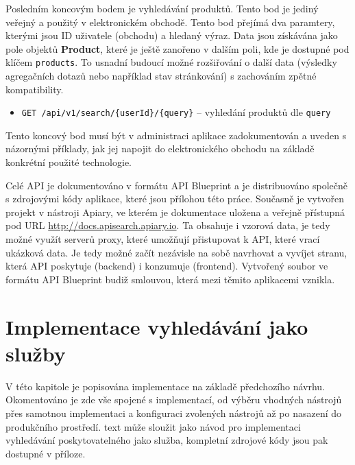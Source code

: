 \documentclass[FM,DP]{tulthesis}
\begin{document}
Posledním koncovým bodem je vyhledávání produktů. Tento bod je jediný veřejný a použitý
v elektronickém obchodě. Tento bod přejímá dva paramtery, kterými jsou ID uživatele
(obchodu) a hledaný výraz. Data jsou získávána jako pole objektů \textbf{Product}, 
které je ještě zanořeno v dalším poli, kde je dostupné pod klíčem \verb|products|.
To usnadní budoucí možné rozšiřování o další data (výsledky agregačních dotazů nebo 
například stav stránkování) s zachováním zpětné kompatibility.

\begin{itemize}
\item \verb|GET /api/v1/search/{userId}/{query}| -- vyhledání produktů dle \verb|query|
\end{itemize}

Tento koncový bod musí být v administraci aplikace zadokumentován a uveden s názornými 
příklady, jak jej napojit do elektronického obchodu na základě konkrétní použité technologie.

Celé API je dokumentováno v formátu API Blueprint a je distribuováno společně s zdrojovými
kódy aplikace, které jsou přílohou této práce. Současně je vytvořen projekt v nástroji 
Apiary, ve kterém je dokumentace uložena a veřejně přístupná pod URL 
\url{http://docs.apisearch.apiary.io}. Ta obsahuje i vzorová data, 
je tedy možné využít serverů proxy, které umožňují přistupovat k API, které vrací ukázková 
data. Je tedy možné začít nezávisle na sobě navrhovat a vyvíjet stranu, která API poskytuje
(backend) i konzumuje (frontend). Vytvořený soubor ve formátu API Blueprint budiž smlouvou, 
která mezi těmito aplikacemi vznikla.



\chapter{Implementace vyhledávání jako služby}

V této kapitole je popisována implementace na základě předchozího návrhu. Okomentováno je
zde vše spojené s implementací, od výběru vhodných nástrojů přes samotnou implementaci
a konfiguraci zvolených nástrojů až po nasazení do produkčního prostředí.
text může sloužit jako návod pro implementaci vyhledávání poskytovatelného jako
služba, kompletní zdrojové kódy jsou pak dostupné v příloze.
\end{document}
